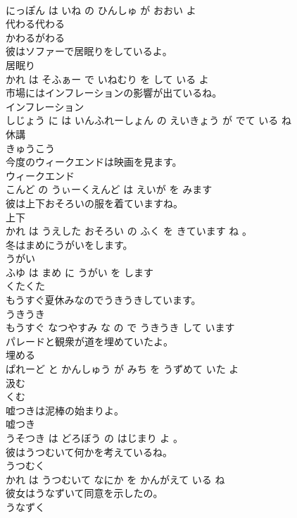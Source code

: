\documentclass[8pt]{extreport}
\begin{document}
\begin{CJK}{UTF8}{min}
\\	にっぽん は いね の ひんしゅ が おおい よ			
\\	代わる代わる	
\\	かわるがわる		
\\	彼はソファーで居眠りをしているよ。	
\\	居眠り 
\\	かれ は そふぁー で いねむり を して いる よ			
\\	市場にはインフレーションの影響が出ているね。	
\\	インフレーション 
\\	しじょう に は いんふれーしょん の えいきょう が でて いる ね			
\\	休講	
\\	きゅうこう		
\\	今度のウィークエンドは映画を見ます。	
\\	ウィークエンド 
\\	こんど の うぃーくえんど は えいが を みます			
\\	彼は上下おそろいの服を着ていますね。	
\\	上下 
\\	かれ は うえした おそろい の ふく を きています ね 。			
\\	冬はまめにうがいをします。	
\\	うがい 
\\	ふゆ は まめ に うがい を します			
\\	くたくた	
\\	もうすぐ夏休みなのでうきうきしています。	
\\	うきうき 
\\	もうすぐ なつやすみ な の で うきうき して います			
\\	パレードと観衆が道を埋めていたよ。	
\\	埋める 
\\	ぱれーど と かんしゅう が みち を うずめて いた よ			
\\	汲む	
\\	くむ		
\\	嘘つきは泥棒の始まりよ。	
\\	嘘つき 
\\	うそつき は どろぼう の はじまり よ 。			
\\	彼はうつむいて何かを考えているね。	
\\	うつむく 
\\	かれ は うつむいて なにか を かんがえて いる ね			
\\	彼女はうなずいて同意を示したの。	
\\	うなずく 

\end{CJK}
\end{document}
